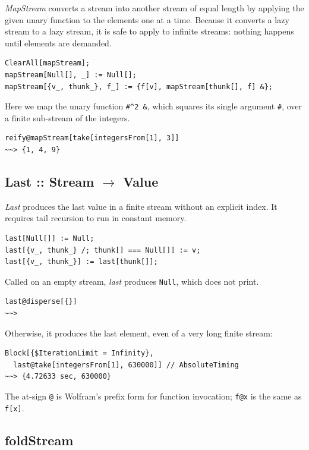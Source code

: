 \documentclass[10pt,oneside,x11names]{article}
\begin{document}
\emph{MapStream} converts a stream into another stream of equal length by applying the
given unary function to the elements one at a time. Because it converts a lazy
stream to a lazy stream, it is safe to apply to infinite streams: nothing
happens until elements are demanded.

\begin{verbatim}
ClearAll[mapStream];
mapStream[Null[], _] := Null[];
mapStream[{v_, thunk_}, f_] := {f[v], mapStream[thunk[], f] &};
\end{verbatim}

Here we map the unary function \texttt{\#\textasciicircum{}2 \&}, which squares its single argument \texttt{\#},
over a finite sub-stream of the integers.

\begin{verbatim}
reify@mapStream[take[integersFrom[1], 3]]
~~> {1, 4, 9}
\end{verbatim}

\subsection{Last :: Stream \(\rightarrow\) Value}
\label{sec:orgheadline10}

\emph{Last} produces the last value in a finite stream without an
explicit index. It requires tail recursion to run in constant memory.

\begin{verbatim}
last[Null[]] := Null;
last[{v_, thunk_} /; thunk[] === Null[]] := v;
last[{v_, thunk_}] := last[thunk[]];
\end{verbatim}

Called on an empty stream, \emph{last} produces \texttt{Null}, which does not print.

\begin{verbatim}
last@disperse[{}]
~~>
\end{verbatim}

\noindent Otherwise, it produces the last element, even of a very long finite stream:

\begin{verbatim}
Block[{$IterationLimit = Infinity},
  last@take[integersFrom[1], 630000]] // AbsoluteTiming
~~> {4.72633 sec, 630000}
\end{verbatim}

\noindent The at-sign \texttt{@} is Wolfram's prefix form for function invocation;
\texttt{f@x} is the same as \texttt{f[x]}.

\subsection{foldStream}
\label{sec:orgheadline11}
\end{document}
